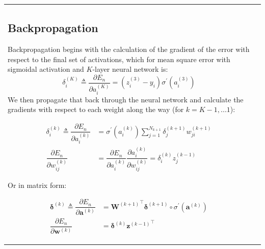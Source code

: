 \documentclass{article}
\begin{document}
\begin{table}[htb!]
\begin{tabular}{ll}
{    \subsection{Backpropagation}
    Backpropagation begins with the calculation of the gradient of the error with respect to the final set of activations, which for mean square error with sigmoidal activation and $K$-layer neural network is:
    \begin{equation*}
        \delta_i^{(K)} \triangleq \dfrac{\partial E_n}{\partial a_i^{(K)}} = (z_i^{(3)} - y_i) \sigma^{'}(a_i^{(3)})
    \end{equation*}
    We then propagate that back through the neural network and calculate the gradients with respect to each weight along the way (for $k = K-1,...1$):
    
    \begin{align*}
        \delta_i^{(k)} \triangleq \dfrac{\partial E_n}{\partial a_i^{(k)}} &= \sigma^{'}(a_i^{(k)}) \sum\limits_{j=1}^{N_{k+1}} \delta_j^{(k+1)} w_{ji}^{(k+1)} \\
        \dfrac{\partial E_n}{\partial w_{ij}^{(k)}} &= 
        \dfrac{\partial E_n}{\partial a_i^{(k)}} \dfrac{\partial a_i^{(k)}}{\partial w_{ij}^{(k)}} = \delta_i^{(k)} z_j^{(k-1)}
    \end{align*}
    
    Or in matrix form:
    
    \begin{align*}
         \bm{\delta}^{(k)} \triangleq \dfrac{\partial E_n}{\partial \mathbf{a}^{(k)}} &= {\mathbf{W}^{(k+1)}}^{\top} \bm{\delta}^{(k+1)} \circ \sigma^{'}(\mathbf{a}^{(k)}) \\
         \dfrac{\partial E_n}{\partial \mathbf{w}^{(k)}} &= \bm{\delta}^{(k)} {\mathbf{z}^{(k-1)}}^{\top}
    \end{align*}

}
\end{tabular}
\end{table}
\end{document}

